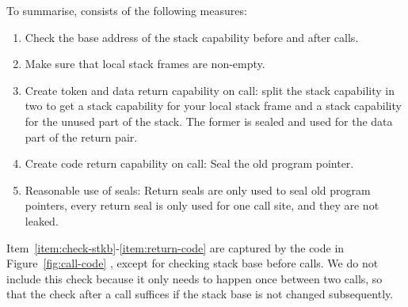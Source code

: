 \documentclass[acmsmall,screen]{acmart}\settopmatter{}
\begin{document}
To summarise, \stktokens{} consists of the following measures:
\begin{enumerate}
\item \label{item:check-stkb} Check the base address of the stack capability before and after calls.
\item \label{item:non-empty-sf} Make sure that local stack frames are non-empty.
\item \label{item:return-data} Create token and data return capability on call: split the stack capability in two to get a stack capability for your local stack frame and a stack capability for the unused part of the stack. The former is sealed and used for the data part of the return pair.
\item \label{item:return-code} Create code return capability on call: Seal the old program pointer.
\item Reasonable use of seals: Return seals are only used to seal old program pointers, every return seal is only used for one call site, and they are not leaked.
\end{enumerate}
Item~\ref{item:check-stkb}-\ref{item:return-code} are captured by the code in Figure~\ref{fig:call-code} , except for checking stack base before calls.
We do not include this check because it only needs to happen once between two calls, so that the check after a call suffices if the stack base is not changed subsequently.
\end{document}
